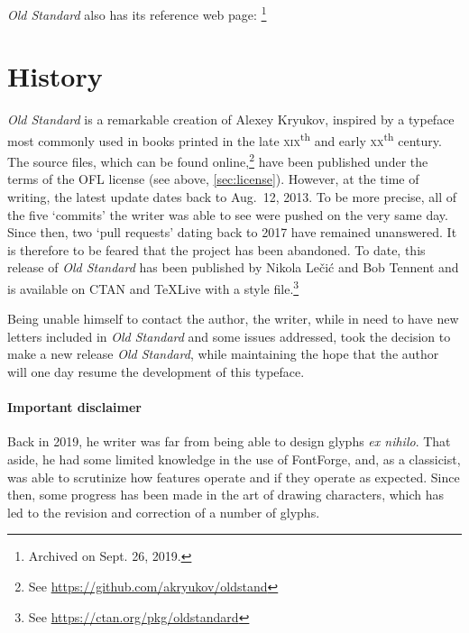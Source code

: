 \emph{Old Standard} also has its reference web page:
%
\footnote{Archived on Sept. 26, 2019.}

\section{History}
\label{sec:history}
\emph{Old Standard} is a remarkable creation of Alexey Kryukov,
inspired by a typeface most commonly used in books printed in the late
\textsc{xix}\textsuperscript{th} and early
\textsc{xx}\textsuperscript{th} century. The source files, which can
be found online,\footnote{See
  \url{https://github.com/akryukov/oldstand}} have been published
under the terms of the OFL license (see above,
\vref{sec:license}). However, at the time of writing, the latest
update dates back to Aug.\ 12, 2013. To be more precise, all of the
five \enquote*{commits} the writer was able to see were pushed on the
very same day. Since then, two \enquote*{pull requests} dating back to
2017 have remained unanswered. It is therefore to be feared that the
project has been abandoned.  To date, this release of \emph{Old
  Standard} has been published by Nikola Lečić and Bob Tennent and is
available on CTAN and {\TeX}Live with a style file.\footnote{See
  \url{https://ctan.org/pkg/oldstandard}}

Being unable himself to contact the author, the writer, while in need
to have new letters included in \emph{Old Standard} and some issues
addressed, took the decision to make a new release \emph{Old
  Standard}, while maintaining the hope that the author will one day
resume the development of this typeface.

\paragraph{Important disclaimer}
Back in 2019, he writer was far from being able to design glyphs
\emph{ex nihilo}. That aside, he had some limited knowledge in the use
of FontForge, and, as a classicist, was able to scrutinize how
features operate and if they operate as expected. Since then, some
progress has been made in the art of drawing characters, which has led
to the revision and correction of a number of glyphs.

